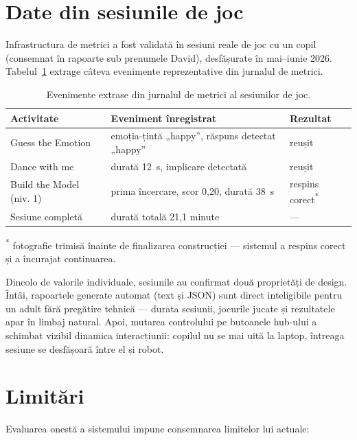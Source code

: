 \section{Date din sesiunile de joc}

Infrastructura de metrici a fost validată în sesiuni reale de joc cu un copil (consemnat în rapoarte sub prenumele David), desfășurate în mai--iunie 2026. Tabelul~\ref{an:tab:sesiuni} extrage câteva evenimente reprezentative din jurnalul de metrici.

\begin{table}[htb]
    \centering
    \caption{Evenimente extrase din jurnalul de metrici al sesiunilor de joc.}
    \label{an:tab:sesiuni}
    \begin{tabular}{|l|>{\raggedright\arraybackslash}p{6cm}|l|}
        \hline
        \textbf{Activitate} & \textbf{Eveniment înregistrat} & \textbf{Rezultat} \\
        \hline
        Guess the Emotion & emoția-țintă „happy”, răspuns detectat „happy” & reușit \\
        Dance with me & durată 12~s, implicare detectată & reușit \\
        Build the Model (niv. 1) & prima încercare, scor 0,20, durată 38~s & respins corect\textsuperscript{*} \\
        Sesiune completă & durată totală 21,1 minute & — \\
        \hline
    \end{tabular}

    \raggedright\footnotesize\textsuperscript{*} fotografie trimisă înainte de finalizarea construcției — sistemul a respins corect și a încurajat continuarea.
\end{table}

Dincolo de valorile individuale, sesiunile au confirmat două proprietăți de design. Întâi, rapoartele generate automat (text și JSON) sunt direct inteligibile pentru un adult fără pregătire tehnică — durata sesiunii, jocurile jucate și rezultatele apar în limbaj natural. Apoi, mutarea controlului pe butoanele hub-ului a schimbat vizibil dinamica interacțiunii: copilul nu se mai uită la laptop, întreaga sesiune se desfășoară între el și robot.

\section{Limitări}

Evaluarea onestă a sistemului impune consemnarea limitelor lui actuale:

